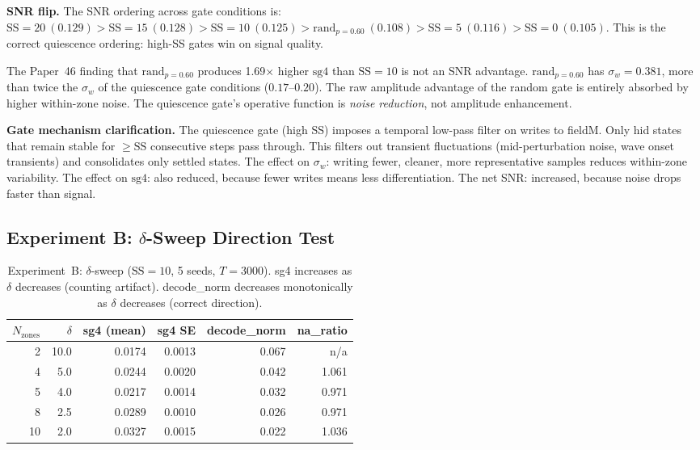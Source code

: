 \documentclass[11pt,a4paper]{article}
\begin{document}
\textbf{SNR flip.}  The SNR ordering across gate conditions is:
$\mathrm{SS}{=}20\ (0.129) > \mathrm{SS}{=}15\ (0.128) > \mathrm{SS}{=}10\
(0.125) > \mathrm{rand}_{p=0.60}\ (0.108) > \mathrm{SS}{=}5\ (0.116) >
\mathrm{SS}{=}0\ (0.105)$.  This is the correct quiescence ordering: high-SS
gates win on signal quality.

The Paper~46 finding that $\mathrm{rand}_{p=0.60}$ produces 1.69$\times$ higher
$\mathrm{sg4}$ than $\mathrm{SS}{=}10$ is not an SNR advantage.
$\mathrm{rand}_{p=0.60}$ has $\sigma_w = 0.381$, more than twice the $\sigma_w$
of the quiescence gate conditions ($0.17$--$0.20$).  The raw amplitude advantage
of the random gate is entirely absorbed by higher within-zone noise.  The
quiescence gate's operative function is \emph{noise reduction}, not amplitude
enhancement.

\textbf{Gate mechanism clarification.}  The quiescence gate (high SS) imposes
a temporal low-pass filter on writes to fieldM.  Only hid states that remain
stable for $\geq\mathrm{SS}$ consecutive steps pass through.  This filters out
transient fluctuations (mid-perturbation noise, wave onset transients) and
consolidates only settled states.  The effect on $\sigma_w$: writing fewer,
cleaner, more representative samples reduces within-zone variability.  The
effect on $\mathrm{sg4}$: also reduced, because fewer writes means less
differentiation.  The net SNR: increased, because noise drops faster than
signal.

\subsection{Experiment B: $\delta$-Sweep Direction Test}

\begin{table}[h]
\centering
\caption{Experiment~B: $\delta$-sweep ($\mathrm{SS}{=}10$, 5 seeds, $T=3000$).
  sg4 increases as $\delta$ decreases (counting artifact).
  decode\_norm decreases monotonically as $\delta$ decreases (correct direction).}
\label{tab:expb}
\begin{tabular}{rrrrrr}
\toprule
$N_\text{zones}$ & $\delta$ & sg4 (mean) & sg4 SE & decode\_norm & na\_ratio \\
\midrule
2  & 10.0 & 0.0174 & 0.0013 & 0.067 & n/a   \\
4  &  5.0 & 0.0244 & 0.0020 & 0.042 & 1.061 \\
5  &  4.0 & 0.0217 & 0.0014 & 0.032 & 0.971 \\
8  &  2.5 & 0.0289 & 0.0010 & 0.026 & 0.971 \\
10 &  2.0 & 0.0327 & 0.0015 & 0.022 & 1.036 \\
\bottomrule
\end{tabular}
\end{table}
\end{document}
